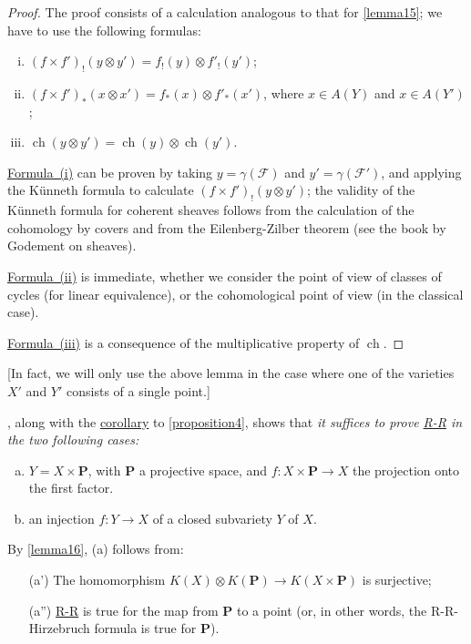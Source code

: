 \documentclass{article}
\theoremstyle{plain}
\theoremstyle{definition}
\newcommand{\sh}[1]{{\mathscr{#1}}}
\newcommand{\PP}{\mathbf{P}}
\DeclareMathOperator{\ch}{ch}
\newcommand{\oldpage}[1]{\marginpar{\footnotesize$\Big\vert$ \textit{p.~#1}}}
\begin{document}
\begin{proof}
  The proof consists of a calculation analogous to that for \cref{lemma15};
  we have to use the following formulas:
  \begin{enumerate}[(i)]
    \item $(f\times f')_!(y\otimes y') = f_!(y)\otimes f'_!(y')$;
      \label{lemma16equation1}
    \item $(f\times f')_*(x\otimes x') = f_*(x)\otimes f'_*(x')$, where $x\in A(Y)$ and $x\in A(Y')$;
      \label{lemma16equation2}
    \item $\ch(y\otimes y') = \ch(y)\otimes\ch(y')$.
      \label{lemma16equation3}
  \end{enumerate}

  \hyperref[lemma16equation1]{Formula~(i)} can be proven by taking $y=\gamma(\sh{F})$ and $y'=\gamma(\sh{F}')$, and applying the K\"{u}nneth formula to calculate $(f\times f')_!(y\otimes y')$;
  the validity of the K\"{u}nneth formula for coherent sheaves follows from the calculation of the cohomology by covers and from the Eilenberg-Zilber theorem (see the book by Godement on sheaves).

  \hyperref[lemma16equation2]{Formula~(ii)} is immediate, whether we consider the point of view of classes of cycles (for linear equivalence), or the cohomological point of view (in the classical case).

  \oldpage{115}
  \hyperref[lemma16equation3]{Formula~(iii)} is a consequence of the multiplicative property of $\ch$.
\end{proof}

[In fact, we will only use the above lemma in the case where one of the varieties $X'$ and $Y'$ consists of a single point.]

, along with the \hyperref[corollary5]{corollary} to \cref{proposition4}, shows that \emph{it suffices to prove \hyperref[theoremriemannroch]{R-R} in the two following cases:}
\begin{enumerate}[(a)]
  \item $Y=X\times\PP$, with $\PP$ a projective space, and $f\colon X\times\PP\to X$ the projection onto the first factor.
  \item an injection $f\colon Y\to X$ of a closed subvariety $Y$ of $X$.
\end{enumerate}

By \cref{lemma16}, (a) follows from:
\begin{enumerate}
  \item[\rm{(a')}] The homomorphism $K(X)\otimes K(\PP)\to K(X\times\PP)$ is surjective;
  \item[\rm{(a'')}] \hyperref[theoremriemannroch]{R-R} is true for the map from $\PP$ to a point (or, in other words, the R-R-Hirzebruch formula is true for $\PP$).
\end{enumerate}
\end{document}

